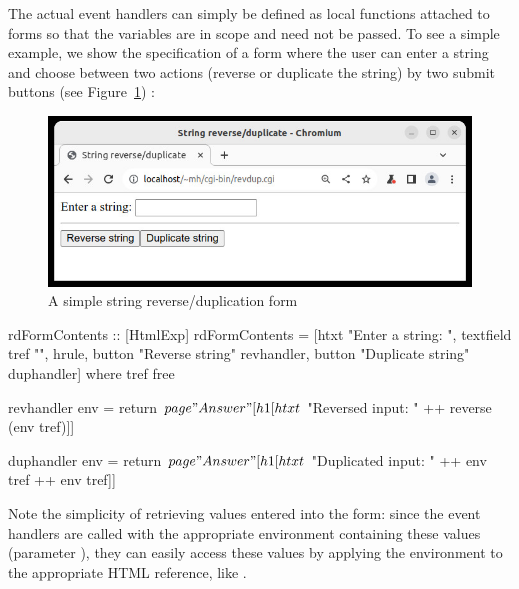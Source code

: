 The actual event handlers can simply be defined as local functions
attached to forms so that the  variables are in scope
and need not be passed.
To see a simple example, we show the specification of
a form where the user can enter a string and choose between two
actions (reverse or duplicate the string) by two submit buttons
(see Figure~\ref{fig-revdup}) :
%
\begin{figure}[t]
\begin{center}
\includegraphics[scale=0.6]{PICTURES/revdup.jpg}
\end{center}\vspace{-3ex}
\caption{A simple string reverse/duplication form\label{fig-revdup}}
\end{figure}
%
\begin{curry}
rdFormContents :: [HtmlExp]
rdFormContents =
  [htxt "Enter a string: ", textfield tref "", hrule,
   button "Reverse string"   revhandler,
   button "Duplicate string" duphandler]
 where
   tref free

   revhandler env = return $ page "Answer"
     [h1 [htxt $ "Reversed input: " ++ reverse (env tref)]]

   duphandler env = return $ page "Answer"
     [h1 [htxt $ "Duplicated input: " ++ env tref ++ env tref]]
\end{curry}
%
Note the simplicity of retrieving values entered into the form:
since the event handlers are called with the appropriate environment
containing these values (parameter ),
they can easily access these values
by applying the environment to the appropriate HTML reference,
like .

